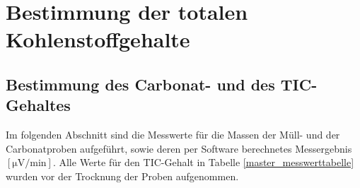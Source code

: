 
\newpage

\section{Bestimmung der totalen Kohlenstoffgehalte}
\subsection{Bestimmung des Carbonat- und des TIC-Gehaltes}
\label{sec:tic}

\vspace*{5mm}

Im folgenden Abschnitt sind die Messwerte für die Massen %
der Müll- und der Carbonatproben aufgeführt, sowie deren per Software berechnetes Messergebnis $\left[\si{\micro \volt \per \minute}\right]$. Alle Werte für den TIC-Gehalt in Tabelle \ref{master_messwerttabelle} wurden vor der Trocknung der Proben aufgenommen.
\vspace*{5mm}
